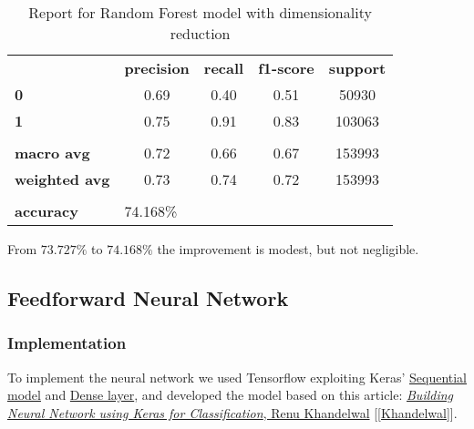 \begin{table}[h!]
    \centering
    \begin{tabular}{lcccc}
        \rowcolor[HTML]{EEEEEE} 
        \cellcolor[HTML]{FBFBFB} & \textbf{precision} & \textbf{recall} & \textbf{f1-score} & \textbf{support} \\
        \rowcolor[HTML]{EEEEEE} 
        \textbf{0}               & 0.69               & 0.40            & 0.51              & 50930            \\
        \rowcolor[HTML]{EEEEEE} 
        \textbf{1}               & 0.75               & 0.91            & 0.83              & 103063           \\
        \rowcolor[HTML]{FBFBFB} 
        &                    &                 &                   &                  \\
        \rowcolor[HTML]{EEEEEE} 
        \textbf{macro avg}       & 0.72               & 0.66            & 0.67              & 153993           \\
        \rowcolor[HTML]{EEEEEE} 
        \textbf{weighted avg}    & 0.73               & 0.74            & 0.72              & 153993           \\
        \rowcolor[HTML]{FBFBFB} 
        &                    &                 &                   &                  \\
        \rowcolor[HTML]{EEEEEE} 
        \textbf{accuracy}        & \multicolumn{4}{l}{\cellcolor[HTML]{EEEEEE}74.168\%}                         
    \end{tabular}
    \caption{Report for Random Forest model with dimensionality reduction}
    \label{tab:rf-res-1}
\end{table}

From $73.727\%$ to $74.168\%$ the improvement is modest, but not negligible.


\newpage
\subsection{Feedforward Neural Network}\label{sec:nn}

\subsubsection{Implementation}

To implement the neural network we used Tensorflow exploiting Keras' \href{https://www.tensorflow.org/api_docs/python/tf/keras/Sequential}{Sequential model} and \href{https://www.tensorflow.org/api_docs/python/tf/keras/layers/Dense}{Dense layer}, and developed the model based on this article: \href{https://medium.com/datadriveninvestor/building-neural-network-using-keras-for-classification-3a3656c726c1}{\textit{Building Neural Network using Keras for Classification}, Renu Khandelwal} [\ref{Khandelwal}].

